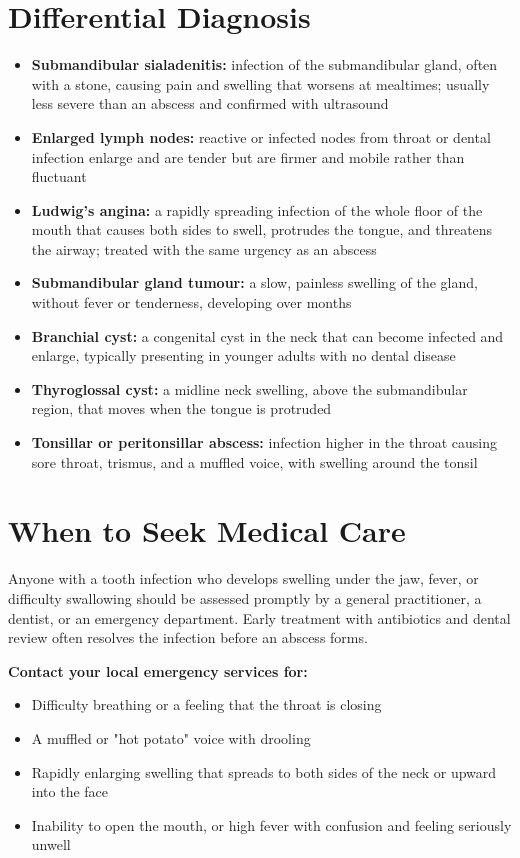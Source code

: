 \section*{Differential Diagnosis}
\begin{itemize}
    \item \textbf{Submandibular sialadenitis:} infection of the submandibular gland, often with a stone, causing pain and swelling that worsens at mealtimes; usually less severe than an abscess and confirmed with ultrasound
    \item \textbf{Enlarged lymph nodes:} reactive or infected nodes from throat or dental infection enlarge and are tender but are firmer and mobile rather than fluctuant
    \item \textbf{Ludwig's angina:} a rapidly spreading infection of the whole floor of the mouth that causes both sides to swell, protrudes the tongue, and threatens the airway; treated with the same urgency as an abscess
    \item \textbf{Submandibular gland tumour:} a slow, painless swelling of the gland, without fever or tenderness, developing over months
    \item \textbf{Branchial cyst:} a congenital cyst in the neck that can become infected and enlarge, typically presenting in younger adults with no dental disease
    \item \textbf{Thyroglossal cyst:} a midline neck swelling, above the submandibular region, that moves when the tongue is protruded
    \item \textbf{Tonsillar or peritonsillar abscess:} infection higher in the throat causing sore throat, trismus, and a muffled voice, with swelling around the tonsil
\end{itemize}

\section*{When to Seek Medical Care}
Anyone with a tooth infection who develops swelling under the jaw, fever, or difficulty swallowing should be assessed promptly by a general practitioner, a dentist, or an emergency department. Early treatment with antibiotics and dental review often resolves the infection before an abscess forms.

\textbf{Contact your local emergency services for:}
\begin{itemize}
    \item Difficulty breathing or a feeling that the throat is closing
    \item A muffled or "hot potato" voice with drooling
    \item Rapidly enlarging swelling that spreads to both sides of the neck or upward into the face
    \item Inability to open the mouth, or high fever with confusion and feeling seriously unwell
\end{itemize}

